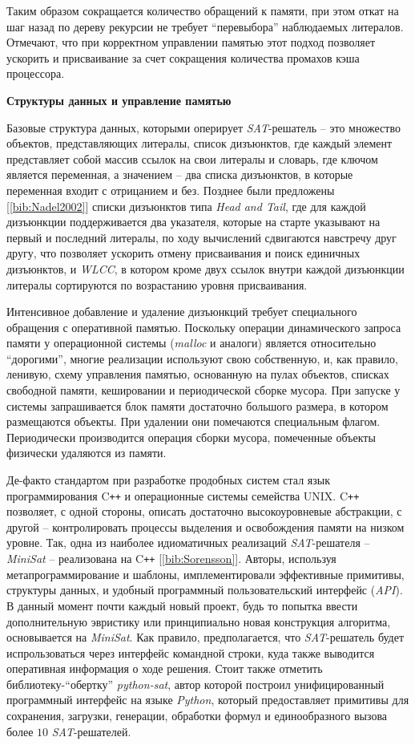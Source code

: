 Таким образом сокращается количество обращений к памяти, при этом откат на шаг назад по дереву рекурсии не требует \enquote{перевыбора} наблюдаемых литералов. Отмечают, что при корректном управлении памятью этот подход позволяет ускорить и присваивание за счет сокращения количества промахов кэша процессора.

\textbf{Структуры данных и управление памятью}

Базовые структура данных, которыми оперирует \textit{SAT}-решатель – это множество объектов, представляющих литералы, список дизъюнктов, где каждый элемент представляет собой массив ссылок на свои литералы и словарь, где ключом является переменная, а значением – два списка дизъюнктов, в которые переменная входит с отрицанием и без. Позднее были предложены [\ref{bib:Nadel2002}] списки дизъюнктов типа \textit{Head and Tail}, где для каждой дизъюнкции поддерживается два указателя, которые на старте указывают на первый и последний литералы, по ходу вычислений сдвигаются навстречу друг другу, что позволяет ускорить отмену присваивания и поиск единичных дизъюнктов, и \textit{WLCC}, в котором кроме двух ссылок внутри каждой дизъюнкции литералы сортируются по возрастанию уровня присваивания.

Интенсивное добавление и удаление дизъюнкций требует специального обращения с оперативной памятью. Поскольку операции динамического запроса памяти у операционной системы (\textit{malloc} и аналоги) является относительно \enquote{дорогими}, многие реализации используют свою собственную, и, как правило, ленивую, схему управления памятью, основанную на пулах объектов, списках свободной памяти, кешировании и периодической сборке мусора. При запуске у системы запрашивается блок памяти достаточно большого размера, в котором размещаются объекты. При удалении они помечаются специальным флагом. Периодически производится операция сборки мусора, помеченные объекты физически удаляются из памяти.

Де-факто стандартом при разработке продобных систем стал язык программирования C\texttt{++} и операционные системы семейства UNIX.
C\texttt{++} позволяет, с одной стороны, описать достаточно высокоуровневые абстракции, с другой – контролировать процессы выделения и освобождения памяти на низком уровне. Так, одна из наиболее идиоматичных реализаций \textit{SAT}-решателя – \textit{MiniSat} – реализована на C\texttt{++} [\ref{bib:Sorensson}]. Авторы, используя метапрограммирование и шаблоны, имплементировали эффективные примитивы, структуры данных, и удобный программный пользовательский интерфейс (\textit{API}). В данный момент почти каждый новый проект, будь то попытка ввести дополнительную эвристику или принципиально новая конструкция алгоритма, основывается на \textit{MiniSat}. Как правило, предполагается, что \textit{SAT}-решатель будет испрользоваться через интерфейс командной строки, куда также выводится оперативная информация о ходе решения. Стоит также отметить библиотеку-\enquote{обертку} \textit{python-sat}, автор которой построил унифицированный программный интерфейс на языке \textit{Python}, который предоставляет примитивы для сохранения, загрузки, генерации, обработки формул и единообразного вызова более $10$ \textit{SAT}-решателей.

